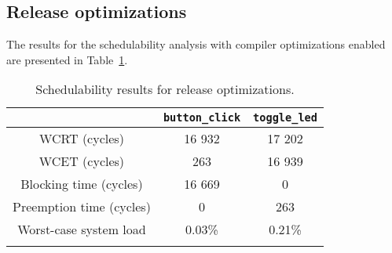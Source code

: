 \subsection{Release optimizations}
The results for the schedulability analysis with compiler
optimizations enabled are presented in Table~\ref{tab:evalschedrelease}.
\begin{longtable}{|c | c | c|}
    \hline
     & \texttt{button\_click} & \texttt{toggle\_led} \\
    \hline
    WCRT (cycles) & 16 932 & 17 202 \\
    \hline
    WCET (cycles) & 263 & 16 939 \\
    \hline
    Blocking time (cycles) & 16 669 & 0 \\
    \hline
    Preemption time (cycles) & 0 & 263 \\
    \hline
    Worst-case system load & 0.03\% & 0.21\% \\
    \hline
\caption{Schedulability results for release optimizations.}
\label{tab:evalschedrelease}
\end{longtable}
